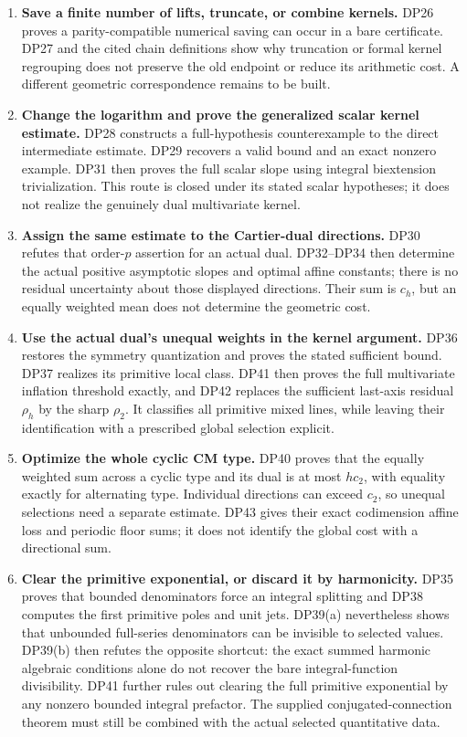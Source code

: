 \documentclass[11pt,a4paper]{article}
\theoremstyle{definition}\newtheorem{remark}[theorem]{Remark}
\begin{document}
\begin{enumerate}[leftmargin=*,label=\arabic*.]
\item \textbf{Save a finite number of lifts, truncate, or combine kernels.} DP26 proves a parity-compatible numerical saving can occur in a bare certificate. DP27 and the cited chain definitions show why truncation or formal kernel regrouping does not preserve the old endpoint or reduce its arithmetic cost. A different geometric correspondence remains to be built.
\item \textbf{Change the logarithm and prove the generalized scalar kernel estimate.} DP28 constructs a full-hypothesis counterexample to the direct intermediate estimate. DP29 recovers a valid bound and an exact nonzero example. DP31 then proves the full scalar slope using integral biextension trivialization. This route is closed under its stated scalar hypotheses; it does not realize the genuinely dual multivariate kernel.
\item \textbf{Assign the same estimate to the Cartier-dual directions.} DP30 refutes that order-$p$ assertion for an actual dual. DP32--DP34 then determine the actual positive asymptotic slopes and optimal affine constants; there is no residual uncertainty about those displayed directions. Their sum is $c_h$, but an equally weighted mean does not determine the geometric cost.
\item \textbf{Use the actual dual's unequal weights in the kernel argument.} DP36 restores the symmetry quantization and proves the stated sufficient bound. DP37 realizes its primitive local class. DP41 then proves the full multivariate inflation threshold exactly, and DP42 replaces the sufficient last-axis residual $\rho_h$ by the sharp $\rho_2$. It classifies all primitive mixed lines, while leaving their identification with a prescribed global selection explicit.
\item \textbf{Optimize the whole cyclic CM type.} DP40 proves that the equally weighted sum across a cyclic type and its dual is at most $hc_2$, with equality exactly for alternating type. Individual directions can exceed $c_2$, so unequal selections need a separate estimate. DP43 gives their exact codimension affine loss and periodic floor sums; it does not identify the global cost with a directional sum.
\item \textbf{Clear the primitive exponential, or discard it by harmonicity.} DP35 proves that bounded denominators force an integral splitting and DP38 computes the first primitive poles and unit jets. DP39(a) nevertheless shows that unbounded full-series denominators can be invisible to selected values. DP39(b) then refutes the opposite shortcut: the exact summed harmonic algebraic conditions alone do not recover the bare integral-function divisibility. DP41 further rules out clearing the full primitive exponential by any nonzero bounded integral prefactor. The supplied conjugated-connection theorem must still be combined with the actual selected quantitative data.
\end{enumerate}
\end{document}
